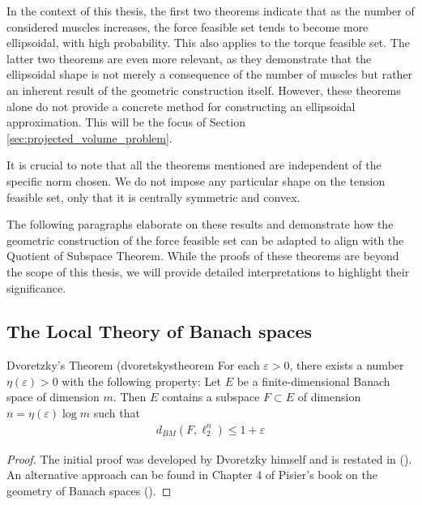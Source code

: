 In the context of this thesis, the first two theorems indicate that as the number of considered muscles increases, the force feasible set tends to become more ellipsoidal, with high probability. This also applies to the torque feasible set. The latter two theorems are even more relevant, as they demonstrate that the ellipsoidal shape is not merely a consequence of the number of muscles but rather an inherent result of the geometric construction itself. However, these theorems alone do not provide a concrete method for constructing an ellipsoidal approximation. This will be the focus of Section \ref{sec:projected_volume_problem}.

It is crucial to note that all the theorems mentioned are independent of the specific norm chosen. We do not impose any particular shape on the tension feasible set, only that it is centrally symmetric and convex.

The following paragraphs elaborate on these results and demonstrate how the geometric construction of the force feasible set can be adapted to align with the Quotient of Subspace Theorem. While the proofs of these theorems are beyond the scope of this thesis, we will provide detailed interpretations to highlight their significance.

\subsection{The Local Theory of Banach spaces}
\label{subsec:theoretical_results_local_theory}

\begin{theorembox}{Dvoretzky's Theorem (\cite{dvoretzkyTHEOREMCONVEXBODIES1961)}}{dvoretskystheorem}
    For each $\varepsilon > 0$, there exists a number $\eta(\varepsilon)>0$ with the following property: Let $E$ be a finite-dimensional Banach space of dimension $m$. Then $E$ contains a subspace $F\subset E$ of dimension $n=\eta(\varepsilon)\log m$ such that 
        \begin{align*}
        d_{BM}(F, \ell_2^n) \leq 1+\varepsilon
        \end{align*}
\end{theorembox}
\begin{proof}
    The initial proof was developed by Dvoretzky himself and is restated in (\cite{milmanDvoretzkyTheoremThirtyYearsLater1992}). An alternative approach can be found in Chapter 4 of Pisier's book on the geometry of Banach spaces (\cite{pisierVolumeConvexBodies1989}).
\end{proof}

